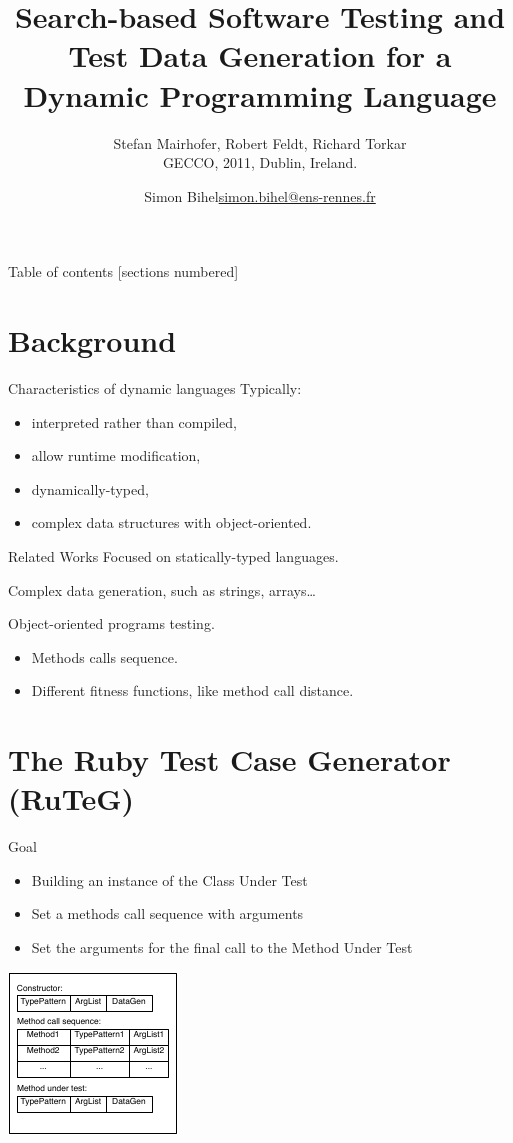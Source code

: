 \documentclass{beamer}
\title{Search-based Software Testing and Test Data Generation for a Dynamic Programming Language}
\subtitle{Stefan Mairhofer, Robert Feldt, Richard Torkar\\
GECCO, 2011, Dublin, Ireland.}
\date{\displaydate{defensedate}}
\author{%
  Simon Bihel\hfill\url{simon.bihel@ens-rennes.fr} \\
}
\institute{%
  COINSE Lab, KAIST, South-Korea
}
\begin{document}
\maketitle

\begin{frame}{Table of contents}
  [sections numbered]
  \tableofcontents[hideallsubsections]
\end{frame}


\section{Background}
\begin{frame}{Characteristics of dynamic languages}
  Typically:
  \begin{itemize}
    \item interpreted rather than compiled,
    \item allow runtime modification,
    \item \alert<2>{dynamically-typed},
    \item \alert<2>{complex data structures with object-oriented}.
  \end{itemize}
  \vfill{}
\end{frame}

\begin{frame}{Related Works}
  Focused on statically-typed languages.

  Complex data generation, such as strings, arrays\dots

  Object-oriented programs testing.
  \begin{itemize}
    \item Methods calls sequence.
    \item Different fitness functions, like method call distance.
  \end{itemize}
\end{frame}


\section{The Ruby Test Case Generator (RuTeG)}
\begin{frame}{Goal}
  \begin{itemize}
    \item Building an instance of the Class Under Test
    \item Set a methods call sequence with arguments
    \item Set the arguments for the final call to the Method Under Test
  \end{itemize}
  \begin{center}
    \includegraphics[height=0.5\textheight]{individual}
  \end{center}
\end{frame}
\end{document}
